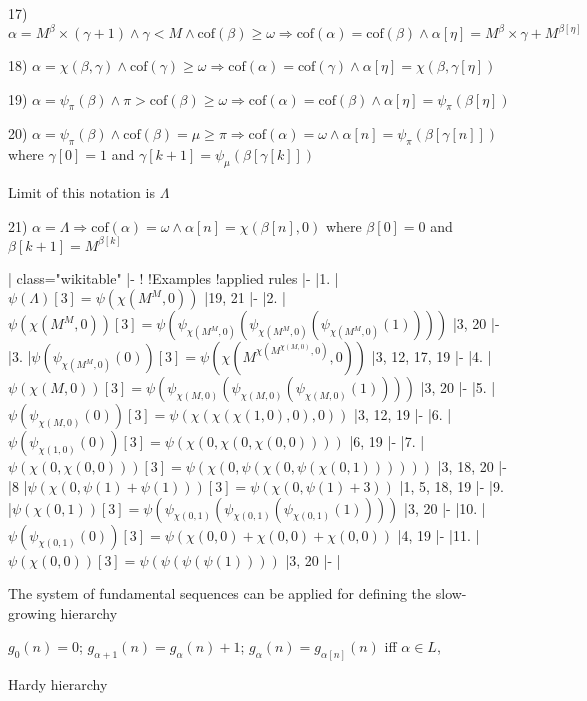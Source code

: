 \documentclass[10pt]{article}
\begin{document}
17) \(\alpha=M^\beta\times(\gamma+1) \wedge \gamma<M \wedge\text{cof}(\beta)\geq\omega \Rightarrow \text{cof}(\alpha)= \text{cof}(\beta) \wedge \alpha[\eta]=M^\beta\times\gamma+M^{\beta[\eta]}\)


18) \(\alpha=\chi(\beta,\gamma) \wedge \text{cof}(\gamma)\geq\omega \Rightarrow \text{cof} (\alpha)=\text{cof}(\gamma)\wedge \alpha[\eta]=\chi(\beta,\gamma[\eta])\)

19) \(\alpha=\psi_\pi(\beta) \wedge \pi>\text{cof}(\beta)\geq\omega \Rightarrow \text{cof} (\alpha)= \text{cof}(\beta) \wedge \alpha[\eta]=\psi_\pi(\beta[\eta])\)

20) \(\alpha=\psi_\pi(\beta) \wedge \text{cof}(\beta)=\mu\geq\pi \Rightarrow \text{cof} (\alpha)=\omega \wedge \alpha[n]=\psi _\pi(\beta[\gamma[n]])\) where  \(\gamma[0]=1\) and  \(\gamma[k+1]=\psi_\mu(\beta[\gamma[k]])\)


Limit of this notation is \(\Lambda\)

21) \(\alpha=\Lambda \Rightarrow \text{cof}(\alpha)=\omega \wedge \alpha[n]=\chi(\beta[n],0)\) where \(\beta[0]=0\) and  \(\beta[k+1]=M^{\beta[k]}\)



{| class="wikitable"
|-
!
!Examples
!applied rules
|-
|1.
|\(\psi(\Lambda)[3]=\psi(\chi(M^M,0))\)
|19, 21
|-
|2.
|\(\psi(\chi(M^M,0))[3]=\psi(\psi_{\chi(M^M,0)}(\psi_{\chi(M^M,0)}(\psi_{\chi(M^M,0)}(1))))\)
|3, 20
|-
|3.
|\(\psi(\psi_{\chi(M^M,0)}(0))[3]=\psi(\chi(M^{\chi(M^{\chi(M,0)},0)},0))\)
|3, 12, 17, 19
|-
|4.
|\(\psi(\chi(M,0))[3]=\psi(\psi_{\chi(M,0)}(\psi_{\chi(M,0)}(\psi_{\chi(M,0)}(1))))\)
|3, 20
|-
|5.
|\(\psi(\psi_{\chi(M,0)}(0))[3]=\psi(\chi(\chi(\chi(1,0),0),0))\)
|3, 12, 19
|-
|6.
|\(\psi(\psi_{\chi(1,0)}(0))[3]=\psi(\chi(0,\chi(0,\chi(0,0))))\)
|6, 19
|-
|7.
|\(\psi(\chi(0,\chi(0,0)))[3]=\psi(\chi(0,\psi(\chi(0,\psi(\chi(0,1))))))\)
|3, 18, 20
|-
|8
|\(\psi(\chi(0, \psi(1)+\psi(1)))[3]=\psi(\chi(0, \psi(1)+3))\)
|1, 5, 18, 19
|-
|9.
|\(\psi(\chi(0,1))[3]=\psi(\psi_{\chi(0,1)}(\psi_{\chi(0,1)}(\psi_{\chi(0,1)}(1))))\)
|3, 20
|-
|10.
|\(\psi(\psi_{\chi(0,1)}(0))[3]=\psi(\chi(0,0)+\chi(0,0)+\chi(0,0))\)
|4, 19
|-
|11.
|\(\psi(\chi(0,0))[3]=\psi(\psi(\psi(\psi(1))))\)
|3, 20
|-
|}



The system of fundamental sequences can be applied for defining the slow-growing hierarchy

\(g_0(n)=0\);  \(g_{\alpha+1}(n)=g_\alpha(n)+1\);  \(g_\alpha(n)=g_{\alpha[n]}(n)\) iff \(\alpha\in L\),

Hardy hierarchy
\end{document}
